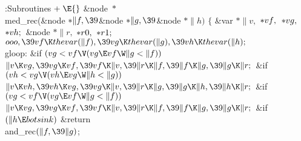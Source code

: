 \Y\B\4:Subroutines\X${}\mathrel+\E{}$\6
\&{node} ${}{*}{}$\\{med\_rec}(\&{node} ${}{*}\|f,\39{}$\&{node} ${}{*}\|g,%
\39{}$\&{node} ${}{*}\|h){}$\1\1\2\2\6
${}\{{}$\1\6
\&{var} ${}{*}\|v,{}$ ${}{*}\\{vf},{}$ ${}{*}\\{vg},{}$ ${}{*}\\{vh};{}$\6
\&{node} ${}{*}\|r,{}$ ${}{*}\\{r0},{}$ ${}{*}\\{r1};{}$\7
${}\\{ooo},\39\\{vf}\K\\{thevar}(\|f),\39\\{vg}\K\\{thevar}(\|g),\39\\{vh}\K%
\\{thevar}(\|h);{}$\6
\4\\{gloop}:\5
\&{if} ${}(\\{vg}<\\{vf}\V(\\{vg}\E\\{vf}\W\|g<\|f)){}$\1\5
${}\|v\K\\{vg},\39\\{vg}\K\\{vf},\39\\{vf}\K\|v,\39\|r\K\|f,\39\|f\K\|g,\39\|g%
\K\|r;{}$\2\6
\&{if} ${}(\\{vh}<\\{vg}\V(\\{vh}\E\\{vg}\W\|h<\|g)){}$\1\5
${}\|v\K\\{vh},\39\\{vh}\K\\{vg},\39\\{vg}\K\|v,\39\|r\K\|g,\39\|g\K\|h,\39\|h%
\K\|r;{}$\2\6
\&{if} ${}(\\{vg}<\\{vf}\V(\\{vg}\E\\{vf}\W\|g<\|f)){}$\1\5
${}\|v\K\\{vg},\39\\{vg}\K\\{vf},\39\\{vf}\K\|v,\39\|r\K\|f,\39\|f\K\|g,\39\|g%
\K\|r;{}$\2\6
\&{if} ${}(\|h\E\\{botsink}){}$\1\5
\&{return} \\{and\_rec}${}(\|f,\39\|g){}$;\2%

